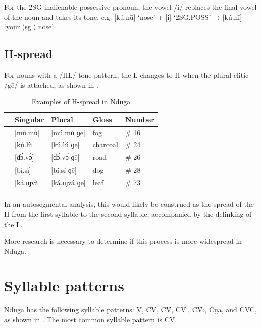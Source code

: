 \documentclass[output=paper,colorlinks,citecolor=brown
]{langscibook}
\begin{document}
For the 2SG inalienable possessive pronoun, the vowel /i/ replaces the final vowel of the noun and takes its tone, e.g. [kú.nū] ‘nose’ + [i] ‘2SG.POSS’ → [kú.nī] ‘your (sg.) nose’.

\subsection{H-spread}

For nouns with a /HL/ tone pattern, the L changes to H when the plural clitic /gē/ is attached, as shown in .

\begin{table}
\caption{Examples of H-spread in Nduga}
\label{tab:olson:hspread}
 \begin{tabular}{lllll}
  \lsptoprule
 & Singular & Plural & Gloss & Number\\
  \midrule
 & [mú.mù] & [mú.mú ɡē] & fog & \# 16 \\
 & [kú.lù] & [kú.lú ɡē] & charcoal & \# 24 \\
 & [ɗɔ́.vɔ̀] & [ɗɔ́.vɔ́ ɡē] & road & \# 26 \\
 & [bí.sì] & [bí.sí ɡē] & dog & \# 28 \\
 & [ká.ɱvà] & [ká.ɱvá ɡē] & leaf & \# 73 \\
  \lspbottomrule
 \end{tabular}
\end{table}

In an autosegmental analysis, this would likely be construed as the spread of the H from the first syllable to the second syllable, accompanied by the delinking of the L.

More research is necessary to determine if this process is more widespread in Nduga.

\section{Syllable patterns}
\label{sec:olson:syllable}

Nduga has the following syllable patterns: V, CV, CṼ, CVː, CṼː, Cu̯a, and CVC, as shown in . The most common syllable pattern is CV.
\end{document}
